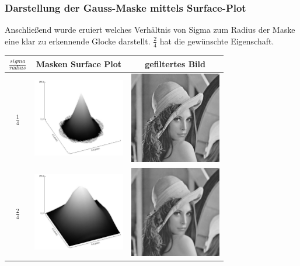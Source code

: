\documentclass[12pt,german]{article}
\begin{document}
\subsubsection{Darstellung der Gauss-Maske mittels Surface-Plot}
Anschließend wurde eruiert welches Verhältnis von Sigma zum Radius der Maske eine klar zu erkennende Glocke darstellt. $ \frac{2}{4} $ hat die gewünschte Eigenschaft. 
\begin{table}[H]
  \centering
  \begin{tabular}{| c | c | c |}
    \hline
    $ \frac{sigma}{radius} $ & Masken Surface Plot & gefiltertes Bild \\
    \hline
    $ \frac{1}{4} $ &
	\includegraphics[width=4cm]{../testData/Gauss/GaussBellR4S1.jpg} & 	\includegraphics[width=4cm]{../testData/Gauss/LenaR4S1.jpg} \\
	    \hline
    $ \frac{2}{4} $ &
	\includegraphics[width=4cm]{../testData/Gauss/GaussBellR4S2.jpg} & 	\includegraphics[width=4cm]{../testData/Gauss/LenaR4S2.jpg} \\

\end{tabular}
\end{table}
\end{document}
